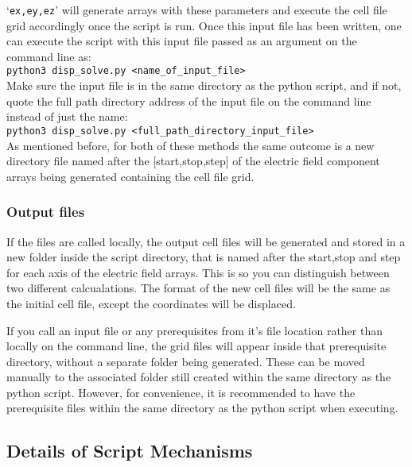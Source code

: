  `\texttt{ex,ey,ez}' will generate arrays with these parameters and execute the cell file grid accordingly once the script is run. Once this input file has been written, one can execute the script with this input file passed as an argument on the command line as:
\\
\texttt{python3 disp\_solve.py <name\_of\_input\_file>}
\\
Make sure the input file is in the same directory as the python script, and if not, quote the full path directory address of the input file on the command line instead of just the name:
\\
\texttt{python3 disp\_solve.py <full\_path\_directory\_input\_file>}
\\
As mentioned before, for both of these methods the same outcome is a new directory file named after the [start,stop,step] of the electric field component arrays being generated containing the cell file grid.

\subsubsection{Output files}

If the files are called locally, the output cell files will be generated and stored in a new folder inside the script directory, that is named after the start,stop and step for each axis of the electric field arrays. This is so you can distinguish between two different calcualations. The format of the new cell files will be the same as the initial cell file, except the coordinates will be displaced.

If you call an input file or any prerequisites from it's file location rather than locally on the command line, the grid files will appear inside that prerequisite directory, without a separate folder being generated. These can be moved manually to the associated folder still created within the same directory as the python script. However, for convenience, it is recommended to have the prerequisite files within the same directory as the python script when executing.

\subsection{Details of Script Mechanisms}

